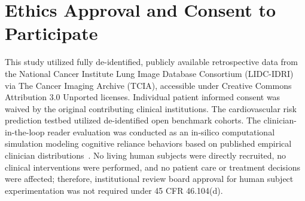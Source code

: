 \documentclass[10pt,journal,compsoc]{IEEEtran}
\begin{document}
\section*{Ethics Approval and Consent to Participate}
This study utilized fully de-identified, publicly available retrospective data from the National Cancer Institute Lung Image Database Consortium (LIDC-IDRI) via The Cancer Imaging Archive (TCIA), accessible under Creative Commons Attribution 3.0 Unported licenses. Individual patient informed consent was waived by the original contributing clinical institutions. The cardiovascular risk prediction testbed utilized de-identified open benchmark cohorts. The clinician-in-the-loop reader evaluation was conducted as an in-silico computational simulation modeling cognitive reliance behaviors based on published empirical clinician distributions~\cite{jacobs2025human}. No living human subjects were directly recruited, no clinical interventions were performed, and no patient care or treatment decisions were affected; therefore, institutional review board approval for human subject experimentation was not required under 45 CFR 46.104(d).



\end{document}

